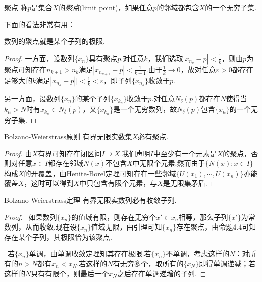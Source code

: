 \begin{definition}{聚点}
	称$p$是集合$X$的\textit{聚点}(limit point)，如果任意$p$的邻域都包含$X$的一个无穷子集.
\end{definition}

下面的看法非常有用：

\begin{proposition}{}
	数列的聚点就是某个子列的极限.
\end{proposition}
\begin{proof}
	一方面，设数列$\{ x_n \}$具有聚点$p$.对任意$k$，我们选取$|x_{n_k}-p|<\frac{1}{k}$，则由$p$为聚点可知存在$n_{k+1}>n_k$满足$|x_{n_{k+1}}-p|<\frac{1}{k+1}$.由于$\frac{1}{k} \to 0$，故对任意$\varepsilon >0$都存在足够大的$k$满足$|x_{n_k}-p||<\frac{1}{k}<\varepsilon$，即子列$\{ x_{n_k} \}$收敛于$p$.
	
	另一方面，设数列$\{ x_n \}$的某个子列$\{ x_{k_n} \}$收敛于$p$.对任意$N_{\delta}(p)$都存在$N$使得当$k_n>N$时有$x_{k_n} \in N_{\delta}(p)$，又$\{ x_{k_n} \}$是一个无穷数列，故$N_{\delta}(p)$包含$\{ x_n \}$的一个无穷子集.
\end{proof}

\begin{lemma}{Bolzano-Weierstrass原则}
	有界无限实数集$X$必有聚点.
\end{lemma}
\begin{proof}
	由$X$有界可知存在闭区间$I \supseteq X$.我们声明$I$中至少有一个元素是$X$的聚点，否则对任意$x \in I$都存在邻域$N(x)$不包含$X$中无限个元素.然而由于$\{ N(x):x \in I \}$构成$X$的开覆盖，由Henite-Borel定理可知存在一些邻域$\{ U(x_1),\cdots ,U(x_n) \}$亦能覆盖$X$，这时可以得到$X$中只包含有限个元素，与$X$是无限集矛盾.
\end{proof}

\begin{theorem}{Bolzano-Weierstrass定理}
	有界无限实数列必有收敛子列.
\end{theorem}
\begin{proof}
	~如果数列$\{ x_n \}$的值域有限，则存在无穷个$x' \in x_n$相等，那么子列$\{ x' \}$为常数列，从而收敛.现在设$\{ x_n \}$值域无限，由引理可知$\{ x_n \}$存在聚点，由命题4.4可知存在某个子列，其极限恰为该聚点.
	
	~若$\{ x_n \}$单调，由单调收敛定理知其存在极限.若$\{ x_n \}$不单调，考虑这样的$N$：对所有的$n>N$都有$x_n<x_N$.若这样的$N$有无穷多个，取所有的$\{ x_N \}$即得单调递减；若这样的$N$只有有限个，则最后一个$x_N$之后存在单调递增的子列.
\end{proof}

